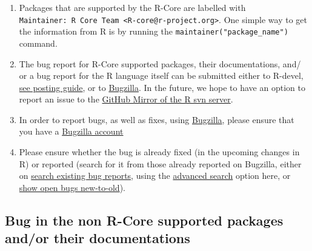 \documentclass[
  letterpaper,
  DIV=11,
  numbers=noendperiod]{scrreprt}
\begin{document}
\begin{enumerate}
\def\labelenumi{\arabic{enumi}.}
\item
  Packages that are supported by the R-Core are labelled with
  \texttt{Maintainer:\ R\ Core\ Team\ \textless{}R-core@r-project.org\textgreater{}}.
  One simple way to get the information from R is by running the
  \texttt{maintainer("package\_name")} command.
\item
  The bug report for R-Core supported packages, their documentations,
  and/ or a bug report for the R language itself can be submitted either
  to R-devel,
  \href{https://www.r-project.org/posting-guide.html\#which_list}{see
  posting guide}, or to
  \href{https://bugs.r-project.org/bugzilla/}{Bugzilla}. In the future,
  we hope to have an option to report an issue to the
  \href{https://github.com/r-devel/r-svn/issues}{GitHub Mirror of the R
  svn server}.
\item
  In order to report bugs, as well as fixes, using
  \hyperref[Bugzilla]{Bugzilla}, please ensure that you have a
  \hyperref[bugzilla-account]{Bugzilla account}
\item
  Please ensure whether the bug is already fixed (in the upcoming
  changes in R) or reported (search for it from those already reported
  on Bugzilla, either on
  \href{https://bugs.r-project.org/bugzilla/query.cgi}{search existing
  bug reports}, using the
  \href{https://bugs.r-project.org/bugzilla/query.cgi?format=advanced}{advanced
  search} option here, or
  \href{https://bugs.r-project.org/bugzilla/buglist.cgi?bug_file_loc_type=allwordssubstr&bug_status=NEW&bug_status=ASSIGNED&bug_status=CONFIRMED&bug_status=REOPENED&bug_status=UNCONFIRMED&bugidtype=include&chfieldto=Now&cmdtype=doit&emailassigned_to1=1&emailassigned_to2=1&emailcc2=1&emailreporter2=1&emailtype1=substring&emailtype2=substring&field0-0-0=noop&long_desc_type=substring&order=bugs.delta_ts\%20desc&query_format=advanced&short_desc_type=allwordssubstr&type0-0-0=noop}{show
  open bugs new-to-old}).
\end{enumerate}

\subsection{Bug in the non R-Core supported packages and/or their
documentations}\label{nonRCorePkgBug}
\end{document}
